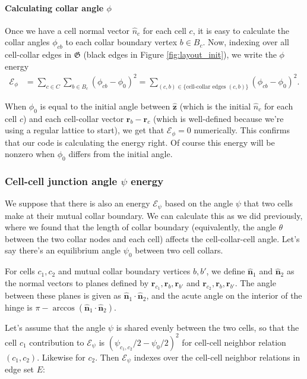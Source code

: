 \documentclass[draft]{article}
\newcommand{\e}{\mathcal{E}}
\begin{document}
\paragraph{Calculating collar angle $\phi$}
Once we have a cell normal vector $\hat{n}_c$ for each cell $c$, it is easy to calculate the collar angles $\phi_{cb}$ to each collar boundary vertex $b\in B_c$. Now, indexing over all cell-collar edges in $\mathfrak{G}$ (black edges in Figure \ref{fig:layout_init}), we write the $\phi$ energy
\begin{align*}
    \e_\phi &= \sum_{c\in C} \sum_{b \in B_c} (\phi_{cb} - \phi_0)^2 = \sum_{(c,b) \in \{\text{cell-collar edges }(c,b) \}} (\phi_{cb} - \phi_0)^2.
\end{align*}

When $\phi_0$ is equal to the initial angle between $\hat{\bm{z}}$ (which is the initial $\hat{n}_c$ for each cell $c$) and each cell-collar vector $\bm{r}_b - \bm{r}_c$ (which is well-defined because we're using a regular lattice to start), we get that $\e_\phi=0$ numerically. This confirms that our code is calculating the energy right. Of course this energy will be nonzero when $\phi_0$ differs from the initial angle. 

\subsubsection{Cell-cell junction angle $\psi$ energy}

We suppose that there is also an energy $\e_\psi$ based on the angle $\psi$ that two cells make at their mutual collar boundary. We can calculate this as we did previously, where we found that the length of collar boundary (equivalently, the angle $\theta$ between the two collar nodes and each cell) affects the cell-collar-cell angle. Let's say there's an equilibrium angle $\psi_0$ between two cell collars.

For cells $c_1, c_2$ and mutual collar boundary vertices $b, b'$, we define $\hat{\bm{n}}_1$ and $\hat{\bm{n}}_2$ as the normal vectors to planes defined by $\bm{r}_{c_1}, \bm{r}_b, \bm{r}_{b'}$ and $\bm{r}_{c_2}, \bm{r}_b, \bm{r}_{b'}$. The angle between these planes is given as $\hat{\bm{n}}_1 \cdot \hat{\bm{n}}_2$, and the acute angle on the interior of the hinge is $\pi - \arccos \left( \hat{\bm{n}}_1 \cdot \hat{\bm{n}}_2 \right)$. 

Let's assume that the angle $\psi$ is shared evenly between the two cells, so that the cell $c_1$ contribution to $\e_\psi$ is $(\psi_{c_1, c_2} / 2 - \psi_0/2)^2$ for cell-cell neighbor relation $(c_1, c_2)$. Likewise for $c_2$. Then $\e_\psi$ indexes over the cell-cell neighbor relations in edge set $E$:
\end{document}
